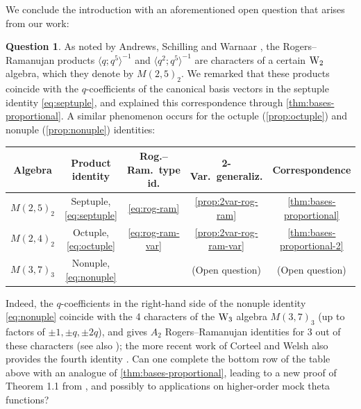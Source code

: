 \documentclass[reqno,11pt]{amsart}
\theoremstyle{definition}
\newtheorem{question}{Question}
\theoremstyle{remark}
\numberwithin{equation}{section}
\renewcommand{\arraystretch}{1.2}
\newcommand{\W}{\textnormal W}
\begin{document}
We conclude the introduction with an aforementioned open question that arises from our work:

\begin{question} \label{qtn:characters}
As noted by Andrews, Schilling and Warnaar \cite[(5.2)]{andrews1999a2}, the Rogers--Ramanujan products $\langle q; q^5 \rangle^{-1}$ and $\langle q^2; q^5 \rangle^{-1}$ are characters of a certain $\W_2$ algebra, which they denote by $M(2, 5)_2$. We remarked that these products coincide with the $q$-coefficients of the canonical basis vectors in the septuple identity \cref{eq:septuple}, and explained this correspondence through \cref{thm:bases-proportional}. A similar phenomenon occurs for the octuple (\cref{prop:octuple}) and nonuple (\cref{prop:nonuple}) identities:
\begin{center}
\renewcommand{\arraystretch}{1.5}
\begin{tabular}{c|c|c|c|c}
     Algebra & Product identity & Rog.--Ram.\ type id. & 2-Var.\ generaliz. & Correspondence\\
     \hline 
     $M(2, 5)_2$ & Septuple, \cref{eq:septuple} & \cref{eq:rog-ram} & \cref{prop:2var-rog-ram} & \cref{thm:bases-proportional} \\
     \hline 
     $M(2, 4)_2$ & Octuple, \cref{eq:octuple} & \cref{eq:rog-ram-var}& 
     \cref{prop:2var-rog-ram-var} & \cref{thm:bases-proportional-2}  \\
     \hline 
     $M(3, 7)_3$ 
     & Nonuple, \cref{eq:nonuple} & \cite[Theorem 1.1]{corteel2019varvec} &
     (Open question) & (Open question)
\end{tabular}
\end{center}
Indeed, the $q$-coefficients in the right-hand side of the nonuple identity \cref{eq:nonuple} coincide with the 4 characters of the $\W_3$ algebra $M(3, 7)_3$ (up to factors of $\pm 1, \pm q, \pm 2q$), and \cite[Theorem 5.2]{andrews1999a2} gives $A_2$ Rogers--Ramanujan identities for 3 out of these characters (see also \cite{warnaar2006hall}); the more recent work of Corteel and Welsh also provides the fourth identity \cite[Theorem 1.1]{corteel2019varvec}. Can one complete the bottom row of the table above with an analogue of \cref{thm:bases-proportional}, leading to a new proof of Theorem 1.1 from \cite{corteel2019varvec}, and possibly to applications on higher-order mock theta functions?


\end{question}
\end{document}
